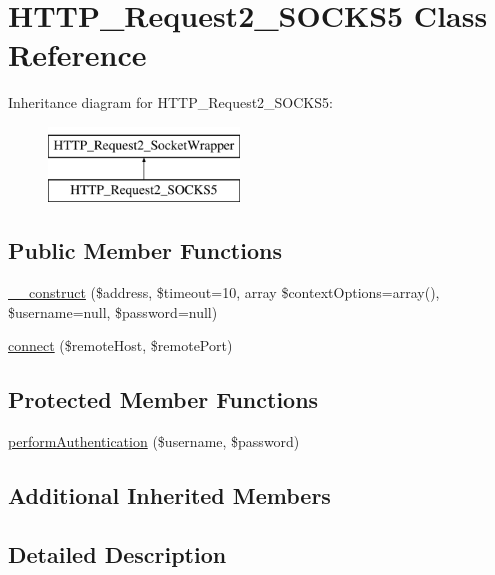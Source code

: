 \hypertarget{classHTTP__Request2__SOCKS5}{\section{H\-T\-T\-P\-\_\-\-Request2\-\_\-\-S\-O\-C\-K\-S5 Class Reference}
\label{classHTTP__Request2__SOCKS5}
}
Inheritance diagram for H\-T\-T\-P\-\_\-\-Request2\-\_\-\-S\-O\-C\-K\-S5\-:\begin{figure}[H]
\begin{center}
\leavevmode
\includegraphics[height=2.000000cm]{classHTTP__Request2__SOCKS5}
\end{center}
\end{figure}
\subsection*{Public Member Functions}
\begin{DoxyCompactItemize}
\item 
\hyperlink{classHTTP__Request2__SOCKS5_a5d609d207d0fe50e541200736ad356f0}{\-\_\-\-\_\-construct} (\$address, \$timeout=10, array \$context\-Options=array(), \$username=null, \$password=null)
\item 
\hyperlink{classHTTP__Request2__SOCKS5_ace8abd1469bf004bc8b0f9edc9915d59}{connect} (\$remote\-Host, \$remote\-Port)
\end{DoxyCompactItemize}
\subsection*{Protected Member Functions}
\begin{DoxyCompactItemize}
\item 
\hyperlink{classHTTP__Request2__SOCKS5_ad01bee6f8681e480282bd055468c1dde}{perform\-Authentication} (\$username, \$password)
\end{DoxyCompactItemize}
\subsection*{Additional Inherited Members}


\subsection{Detailed Description}


